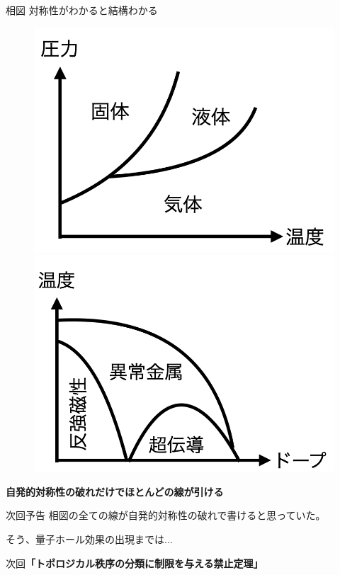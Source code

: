 \documentclass[dvipdfm]{beamer}
\begin{document}
\begin{frame}{相図}
    対称性がわかると結構わかる
    \begin{figure}
        \centering
        \begin{minipage}{0.45\linewidth}
            \includegraphics[width=0.8\linewidth]{phase3.png}
        \end{minipage}
        \begin{minipage}{0.45\linewidth}
            \includegraphics[width=0.8\linewidth]{phase-mag.png}
        \end{minipage}
    \end{figure}
    \textbf{自発的対称性の破れだけでほとんどの線が引ける}
\end{frame}

\begin{frame}{次回予告}
    相図の全ての線が自発的対称性の破れで書けると思っていた。

    そう、量子ホール効果の出現までは...
    
    次回\textbf{「トポロジカル秩序の分類に制限を与える禁止定理」}
\end{frame}
\end{document}
